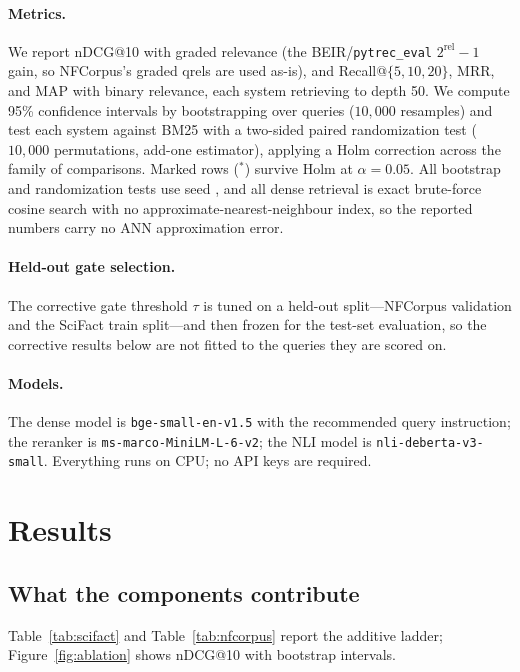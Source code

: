 \documentclass[11pt]{article}
\begin{document}
\paragraph{Metrics.} We report nDCG@10 with graded relevance (the
BEIR/\texttt{pytrec\_eval} $2^{\mathrm{rel}}-1$ gain, so NFCorpus's graded qrels
are used as-is), and Recall@$\{5,10,20\}$, MRR, and MAP with binary relevance,
each system retrieving to depth 50. We compute 95\% confidence
intervals by bootstrapping over queries ($10{,}000$ resamples) and test each
system against BM25 with a two-sided paired randomization test ($10{,}000$
permutations, add-one estimator), applying a Holm correction across the family of
comparisons. Marked rows ($^{*}$) survive Holm at $\alpha{=}0.05$. All bootstrap
and randomization tests use seed \EvalSeed{}, and all dense retrieval is exact
brute-force cosine search with no approximate-nearest-neighbour index, so the
reported numbers carry no ANN approximation error.

\paragraph{Held-out gate selection.} The corrective gate threshold $\tau$ is
tuned on a held-out split---NFCorpus validation and the SciFact train split---and
then frozen for the test-set evaluation, so the corrective results below are not
fitted to the queries they are scored on.

\paragraph{Models.} The dense model is \texttt{bge-small-en-v1.5} with the
recommended query instruction; the reranker is \texttt{ms-marco-MiniLM-L-6-v2};
the NLI model is \texttt{nli-deberta-v3-small}. Everything runs on CPU; no API
keys are required.

\section{Results}

\subsection{What the components contribute}

Table~\ref{tab:scifact} and Table~\ref{tab:nfcorpus} report the additive ladder;
Figure~\ref{fig:ablation} shows nDCG@10 with bootstrap intervals.
\end{document}
